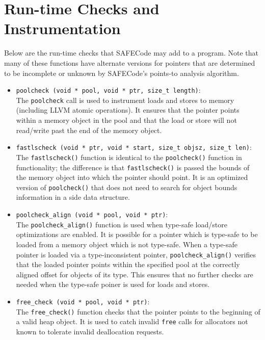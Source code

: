 \section{Run-time Checks and Instrumentation}
\label{section:checks}

Below are the run-time checks that SAFECode may add to a program.
Note that many of these functions have alternate versions for pointers
that are determined to be incomplete or unknown by SAFECode's
points-to analysis algorithm.

\begin{itemize}
\item{\tt poolcheck (void * pool, void * ptr, size\_t length)}: \\
The {\tt poolcheck} call is used to instrument loads and stores to
memory (including LLVM atomic operations).  It ensures that the
pointer points within a memory object in the pool and that the load or
store will not read/write past the end of the memory object.

\item{\tt fastlscheck (void * ptr, void * start, size\_t objsz,
size\_t len)}: \\
The {\tt fastlscheck()} function is identical to the {\tt poolcheck()}
function in functionality; the difference is that {\tt fastlscheck()}
is passed the bounds of the memory object into which the pointer
should point.  It is an optimized version of {\tt poolcheck()} that
does not need to search for object bounds information in a side data
structure.

\item{\tt poolcheck\_align (void * pool, void * ptr)}: \\
The {\tt poolcheck\_align()} function is used when type-safe
load/store optimizations are enabled.  It is possible for a pointer which
is type-safe to be loaded from a memory object which is not type-safe.
When a type-safe pointer is loaded via a type-inconsistent pointer,
{\tt poolcheck\_align()} verifies that the loaded pointer points
within the specified pool at the correctly aligned offset for objects
of its type.  This ensures that no further checks are needed when the
type-safe poiner is used for loads and stores.

\item{\tt free\_check (void * pool, void * ptr)}: \\
The {\tt free\_check()} function checks that the pointer points to
the beginning of a valid heap object.  It is used to catch invalid
{\tt free} calls for allocators not known to tolerate invalid
deallocation requests.


\end{itemize}
